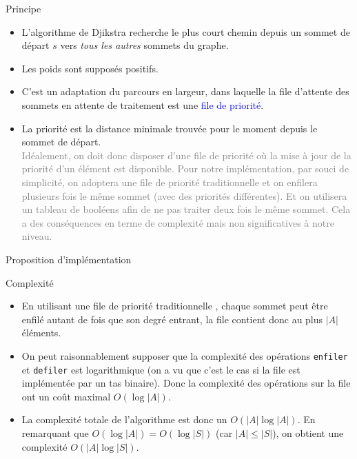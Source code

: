 \documentclass[10pt]{beamer}
\begin{document}
\begin{frame}[fragile]{\Ctitle}{\stitle}
	\begin{block}{Principe}
		\begin{itemize}
		\item<1-> L'algorithme de Djikstra recherche le plus court chemin depuis un sommet de départ $s$ vers \textit{tous les autres} sommets du graphe.
		\item<2-> Les poids sont supposés \textcolor{BrickRed}{positifs}.
		\item<3-> C'est un adaptation du parcours en largeur, dans laquelle la file d'attente des sommets en attente de traitement est une \textcolor{blue}{file de priorité}.
		\item<4->  La priorité est la distance minimale trouvée pour le moment depuis le sommet de départ. \\
		\textcolor{gray}{\small Idéalement, on doit donc disposer d'une file de priorité où la mise à jour de la priorité d'un élément est disponible. Pour notre implémentation, par souci de simplicité, on adoptera une file de priorité \og{} traditionnelle \fg{} et on enfilera plusieurs fois le même sommet (avec des priorités différentes). Et on utilisera un tableau de booléens afin de ne pas traiter deux fois le même sommet. Cela a des conséquences en terme de complexité mais non significatives à notre niveau.}
		\end{itemize}
	\end{block}
\end{frame}

\begin{frame}[fragile]{\Ctitle}{\stitle}
	\begin{block}{Proposition d'implémentation}
	\end{block}
\end{frame}

\begin{frame}[fragile]{\Ctitle}{\stitle}
	\begin{block}{Complexité}
		\begin{itemize}
		\item<1-> En utilisant une file de priorité \og{} traditionnelle \fg{}, chaque sommet peut être enfilé autant de fois que son degré entrant, la file contient donc au plus $|A|$ éléments. 
		\item<2-> On peut raisonnablement supposer que la complexité des opérations {\tt enfiler} et {\tt defiler} est logarithmique (on a vu que c'est le cas si la file est implémentée par un tas binaire). Donc la complexité des opérations sur la file ont un coût maximal $O(\log |A|)$.
		\item<3-> La complexité totale de l'algorithme est donc un $O(|A| \log |A|)$. En remarquant que $O(\log |A|)=O(\log |S|)$ (car $|A| \leq |S|$), on obtient une complexité \textcolor{BrickRed}{$O(|A|\log|S|)$}.
		\end{itemize}
	\end{block}
\end{frame}
\end{document}
